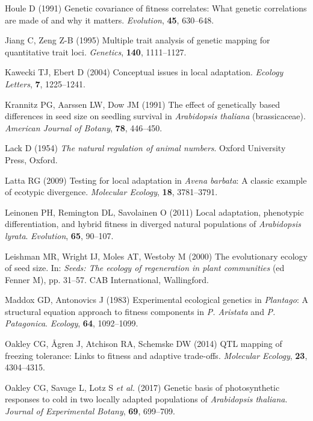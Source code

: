 \documentclass[12pt,]{article}
\begin{document}
\leavevmode\hypertarget{ref-Houle1991}{}%
Houle D (1991) Genetic covariance of fitness correlates: What genetic correlations are made of and why it matters. \emph{Evolution}, \textbf{45}, 630--648.

\leavevmode\hypertarget{ref-jiang1995multiple}{}%
Jiang C, Zeng Z-B (1995) Multiple trait analysis of genetic mapping for quantitative trait loci. \emph{Genetics}, \textbf{140}, 1111--1127.

\leavevmode\hypertarget{ref-Kawecki2004}{}%
Kawecki TJ, Ebert D (2004) Conceptual issues in local adaptation. \emph{Ecology Letters}, \textbf{7}, 1225--1241.

\leavevmode\hypertarget{ref-krannitz1991effect}{}%
Krannitz PG, Aarssen LW, Dow JM (1991) The effect of genetically based differences in seed size on seedling survival in \emph{Arabidopsis thaliana} (brassicaceae). \emph{American Journal of Botany}, \textbf{78}, 446--450.

\leavevmode\hypertarget{ref-Lack1954}{}%
Lack D (1954) \emph{The natural regulation of animal numbers}. Oxford University Press, Oxford.

\leavevmode\hypertarget{ref-Latta2009}{}%
Latta RG (2009) Testing for local adaptation in \emph{Avena barbata}: A classic example of ecotypic divergence. \emph{Molecular Ecology}, \textbf{18}, 3781--3791.

\leavevmode\hypertarget{ref-leinonen2011local}{}%
Leinonen PH, Remington DL, Savolainen O (2011) Local adaptation, phenotypic differentiation, and hybrid fitness in diverged natural populations of \emph{Arabidopsis lyrata}. \emph{Evolution}, \textbf{65}, 90--107.

\leavevmode\hypertarget{ref-Leishman2000}{}%
Leishman MR, Wright IJ, Moles AT, Westoby M (2000) The evolutionary ecology of seed size. In: \emph{Seeds: The ecology of regeneration in plant communities} (ed Fenner M), pp. 31--57. CAB International, Wallingford.

\leavevmode\hypertarget{ref-Maddox1983}{}%
Maddox GD, Antonovics J (1983) Experimental ecological genetics in \emph{Plantago}: A structural equation approach to fitness components in \emph{P. Aristata} and \emph{P. Patagonica}. \emph{Ecology}, \textbf{64}, 1092--1099.

\leavevmode\hypertarget{ref-oakley2014qtl}{}%
Oakley CG, Ågren J, Atchison RA, Schemske DW (2014) QTL mapping of freezing tolerance: Links to fitness and adaptive trade-offs. \emph{Molecular Ecology}, \textbf{23}, 4304--4315.

\leavevmode\hypertarget{ref-oakley2017genetic}{}%
Oakley CG, Savage L, Lotz S \emph{et al.} (2017) Genetic basis of photosynthetic responses to cold in two locally adapted populations of \emph{Arabidopsis thaliana}. \emph{Journal of Experimental Botany}, \textbf{69}, 699--709.
\end{document}
